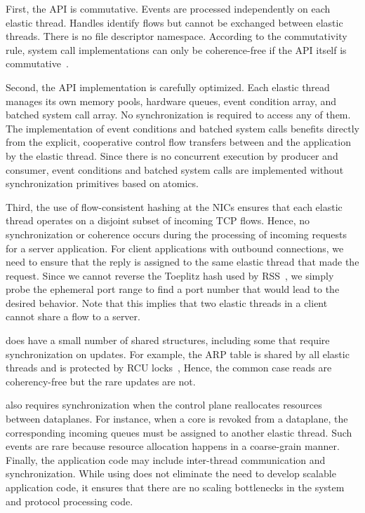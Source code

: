 First, the \ix API is commutative. Events are processed independently
on each elastic thread. Handles identify flows but cannot be exchanged
between elastic threads. There is no file descriptor namespace.
According to the commutativity rule, system call implementations can
only be coherence-free if the API itself is
commutative~\cite{DBLP:conf/sosp/ClementsKZMK13}.

Second, the API implementation is carefully optimized.  Each elastic
thread manages its own memory pools, hardware queues, event condition
array, and batched system call array. No synchronization is required
to access any of them. The implementation of event conditions and
batched system calls benefits directly from the explicit, cooperative
control flow transfers between \ix and the application by the elastic
thread.  Since there is no concurrent execution by producer and
consumer, event conditions and batched system calls are implemented
without synchronization primitives based on
atomics.

Third, the use of flow-consistent hashing at the NICs ensures that
each elastic thread operates on a disjoint subset of incoming TCP
flows. Hence, no synchronization or coherence occurs during the
processing of incoming requests for a server application. For client
applications with outbound connections, we need to ensure that the
reply is assigned to the same elastic thread that made the
request. Since we cannot reverse the Toeplitz hash used by RSS~\cite{url:rss}, we
simply probe the ephemeral port range to find a port number that
would lead to the desired behavior. Note that this implies that two
elastic threads in a client cannot share a flow to a server.


\ix does have a small number of shared structures, including some that
require synchronization on updates.  For example, the ARP table is
shared by all elastic threads and is protected by RCU
locks~\cite{mckenney1998read}, Hence, the common case reads are
coherency-free but the rare updates are not.
%


\ix also requires
synchronization when the control plane reallocates resources between
dataplanes.  For instance, when a core is revoked from a dataplane,
the corresponding incoming queues must be assigned to another elastic
thread. Such events are rare because resource allocation happens in a
coarse-grain manner. Finally, the application code may include
inter-thread communication and synchronization. While using \ix does
not eliminate the need to develop scalable application code, it
ensures that there are no scaling bottlenecks in the system and
protocol processing code. 

